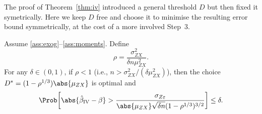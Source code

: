 The proof of Theorem~\ref{thm:iv} introduced a general threshold $D$ but then
fixed it symetrically. Here we keep $D$ free and choose it to minimise the
resulting error bound symmetrically, at the cost of a more involved Step~3.

\begin{theorem}
\label{thm:iv_opt}
    Assume \ref{ass:exog}--\ref{ass:moments}. Define
    \[
        \rho = \frac{\sigma_{ZX}^2}{\delta n\mu_{ZX}^2}.
    \]
    For any $\delta\in(0,1)$, if $\rho < 1$ (i.e., $n > \sigma_{ZX}^2/(\delta\mu_{ZX}^2)$),
    then the choice $D^* = (1-\rho^{1/3})\abs{\mu_{ZX}}$ is optimal and
    \begin{equation}
    \label{eq:iv_bound_opt}
        \Prob\!\left[\abs{\hat{\beta}_{\mathrm{IV}} - \beta} > \frac{\sigma_{Z\varepsilon}}{\abs{\mu_{ZX}}\sqrt{\delta n}(1-\rho^{1/3})^{3/2}} \right] \leq \delta.
    \end{equation}
\end{theorem}

